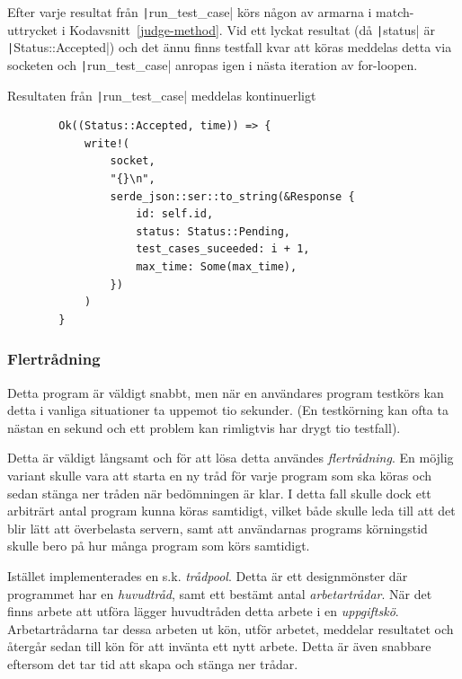 \documentclass{article}
\renewcommand*\listingscaption{Kodavsnitt}
\newcommand*\coderef[1]{\listingscaption~\ref{#1}}
\begin{document}
Efter varje resultat från \texttt|run_test_case| körs någon av armarna i
match-uttrycket i \coderef{judge-method}. Vid ett lyckat resultat (då
\texttt|status| är \texttt|Status::Accepted|) och det ännu finns testfall kvar
att köras meddelas detta via socketen och
\texttt|run_test_case| anropas igen
i nästa iteration av for-loopen.

\begin{listing}[H]
	\caption{Resultaten från \texttt|run_test_case| meddelas kontinuerligt}
	\begin{verbatim}
		Ok((Status::Accepted, time)) => {
			write!(
				socket,
				"{}\n",
				serde_json::ser::to_string(&Response {
					id: self.id,
					status: Status::Pending,
					test_cases_suceeded: i + 1,
					max_time: Some(max_time),
				})
			)
		}
	\end{verbatim}
\end{listing}

\subsubsection{Flertrådning}

Detta program är väldigt snabbt, men när en användares program testkörs kan
detta i vanliga situationer ta uppemot tio sekunder. (En testkörning kan ofta ta
nästan en sekund och ett problem kan rimligtvis har drygt tio testfall).

Detta är väldigt långsamt och för att lösa detta användes \textit{flertrådning}.
En möjlig variant skulle vara att starta en ny tråd för varje program som ska
köras och sedan stänga ner tråden när bedömningen är klar. I detta fall skulle
dock ett arbiträrt antal program kunna köras samtidigt, vilket både skulle leda
till att det blir lätt att överbelasta servern, samt att användarnas programs
körningstid skulle bero på hur många program som körs samtidigt.

Istället implementerades en s.k. \textit{trådpool}. Detta är ett designmönster
där programmet har en \textit{huvudtråd}, samt ett bestämt antal
\textit{arbetartrådar}. När det finns arbete att utföra lägger huvudtråden detta
arbete i en \textit{uppgiftskö}. Arbetartrådarna tar dessa arbeten ut kön, utför
arbetet, meddelar resultatet och återgår sedan till kön för att invänta ett nytt
arbete. Detta är även snabbare eftersom det tar tid att skapa och stänga ner
trådar.
\end{document}
